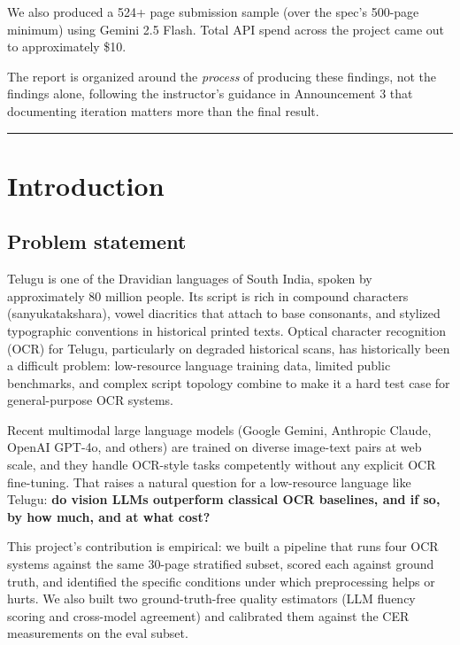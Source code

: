 \documentclass[
  letterpaper,
  DIV=11,
  numbers=noendperiod]{scrartcl}
\begin{document}
We also produced a 524+ page submission sample (over the spec's 500-page
minimum) using Gemini 2.5 Flash. Total API spend across the project came
out to approximately \$10.

The report is organized around the \emph{process} of producing these
findings, not the findings alone, following the instructor's guidance in
Announcement 3 that documenting iteration matters more than the final
result.

\begin{center}\rule{0.5\linewidth}{0.5pt}\end{center}

\section{Introduction}\label{introduction}

\subsection{Problem statement}\label{problem-statement}

Telugu is one of the Dravidian languages of South India, spoken by
approximately 80 million people. Its script is rich in compound
characters (sanyukatakshara), vowel diacritics that attach to base
consonants, and stylized typographic conventions in historical printed
texts. Optical character recognition (OCR) for Telugu, particularly on
degraded historical scans, has historically been a difficult problem:
low-resource language training data, limited public benchmarks, and
complex script topology combine to make it a hard test case for
general-purpose OCR systems.

Recent multimodal large language models (Google Gemini, Anthropic
Claude, OpenAI GPT-4o, and others) are trained on diverse image-text
pairs at web scale, and they handle OCR-style tasks competently without
any explicit OCR fine-tuning. That raises a natural question for a
low-resource language like Telugu: \textbf{do vision LLMs outperform
classical OCR baselines, and if so, by how much, and at what cost?}

This project's contribution is empirical: we built a pipeline that runs
four OCR systems against the same 30-page stratified subset, scored each
against ground truth, and identified the specific conditions under which
preprocessing helps or hurts. We also built two ground-truth-free
quality estimators (LLM fluency scoring and cross-model agreement) and
calibrated them against the CER measurements on the eval subset.
\end{document}
